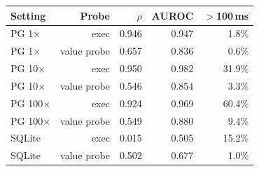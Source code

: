 \begin{tabular}{@{}lrrrr@{}}
\toprule
Setting & Probe & $\rho$ & AUROC & $>$100\,ms \\
\midrule
PG 1$\times$ & exec & 0.946 & 0.947 & 1.8\% \\
PG 1$\times$ & value probe & 0.657 & 0.836 & 0.6\% \\
PG 10$\times$ & exec & 0.950 & 0.982 & 31.9\% \\
PG 10$\times$ & value probe & 0.546 & 0.854 & 3.3\% \\
PG 100$\times$ & exec & 0.924 & 0.969 & 60.4\% \\
PG 100$\times$ & value probe & 0.549 & 0.880 & 9.4\% \\
SQLite & exec & 0.015 & 0.505 & 15.2\% \\
SQLite & value probe & 0.502 & 0.677 & 1.0\% \\
\bottomrule
\end{tabular}